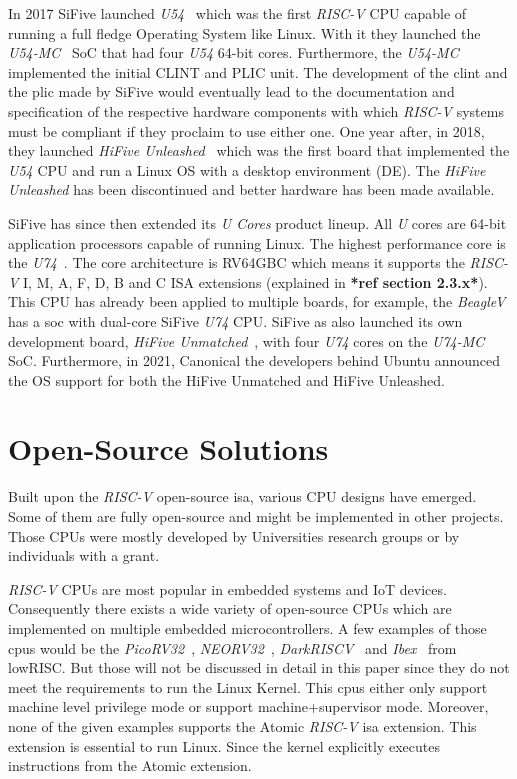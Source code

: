 In 2017 SiFive launched \textit{U54}~\cite{u54} which was the first \textit{RISC-V} CPU capable of running a full fledge Operating System like Linux. With it they launched the \textit{U54-MC}~\cite{u54-mc} SoC that had four \textit{U54} 64-bit cores. Furthermore, the \textit{U54-MC} implemented the initial CLINT and PLIC unit. The development of the \acrshort{clint} and the \acrshort{plic} made by SiFive would eventually lead to the documentation and specification of the respective hardware components with which \textit{RISC-V} systems must be compliant if they proclaim to use either one. One year after, in 2018, they launched \textit{HiFive Unleashed}~\cite{hifive_unleashed} which was the first board that implemented the \textit{U54} CPU and run a Linux OS with a desktop environment (DE). The \textit{HiFive Unleashed} has been discontinued and better hardware has been made available.

SiFive has since then extended its \textit{U Cores} product lineup. All \textit{U} cores are 64-bit application processors capable of running Linux. The highest performance core is the \textit{U74}~\cite{u74}. The core architecture is RV64GBC which means it supports the \textit{RISC-V} I, M, A, F, D, B and C ISA extensions (explained in \textbf{*ref section 2.3.x*}). This CPU has already been applied to multiple boards, for example, the \textit{BeagleV} has a \acrshort{soc} with dual-core SiFive \textit{U74} CPU. SiFive as also launched its own development board, \textit{HiFive Unmatched}~\cite{hifive_unmatched}, with four \textit{U74} cores on the \textit{U74-MC}~\cite{u74-mc} SoC. Furthermore, in 2021, Canonical the developers behind Ubuntu announced the OS support for both the HiFive Unmatched and HiFive Unleashed.

\section{Open-Source Solutions}
\label{section:open_source_solutions}
Built upon the \textit{RISC-V} open-source \acrlong{isa}, various CPU designs have emerged. Some of them are fully open-source and might be implemented in other projects. Those CPUs were mostly developed by Universities research groups or by individuals with a grant.

\textit{RISC-V} CPUs are most popular in embedded systems and IoT devices. Consequently there exists a wide variety of open-source CPUs which are implemented on multiple embedded microcontrollers. A few examples of those \acrshort{cpu}s would be the \textit{PicoRV32}~\cite{picorv32}, \textit{NEORV32}~\cite{neorv32}, \textit{DarkRISCV}~\cite{darkriscv} and \textit{Ibex}~\cite{ibex} from lowRISC. But those will not be discussed in detail in this paper since they do not meet the requirements to run the Linux Kernel. This \acrshort{cpu}s either only support \acrfull{machine} level privilege mode or support \acrfull{machine}+\acrfull{supervisor} mode. Moreover, none of the given examples supports the Atomic \textit{RISC-V} \acrshort{isa} extension. This extension is essential to run Linux. Since the kernel explicitly executes instructions from the Atomic extension.

